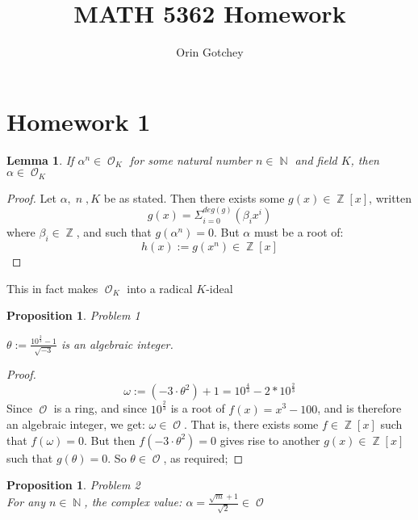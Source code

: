 \documentclass{article}
\newtheorem{lemma}[theorem]{Lemma}
\newtheorem{proposition}[theorem]{Proposition}
\DeclareMathOperator{\Z}{\mathbb{Z}}
\DeclareMathOperator{\N}{\mathbb{N}}
\DeclareMathOperator{\scrO}{\mathscr{O}}
\begin{document}
\title{MATH 5362 Homework}
\author{Orin Gotchey}
\maketitle
\section{Homework 1}
\begin{lemma}
If $\alpha^n\in\scrO_{K}$ for some natural number $n\in\N$ and field $K$, then $\alpha\in\scrO_{K}$
\end{lemma}
\begin{proof}
Let $\alpha,\;n\;,K$ be as stated.  Then there exists some $g(x)\in\Z[x]$, written
\begin{equation}
g(x) = \Sigma_{i=0}^{deg(g)}(\beta_ix^i)
\end{equation}
where $\beta_i\in\Z$, and such that $g(\alpha^n)=0$.  But $\alpha$ must be a root of:
\begin{equation}
h(x) := g(x^n) \in\Z[x]
\end{equation}
\end{proof}
This in fact makes $\scrO_K$ into a radical $K$-ideal
\begin{proposition}{Problem 1}

$\theta := \frac{10^{\frac{2}{3}}-1}{\sqrt{-3}}$ is an algebraic integer.
\end{proposition}
\begin{proof}
\begin{equation}
\omega := (-3\cdot\theta^2)+1 = 10^{\frac{4}{3}} - 2*10^{\frac{2}{3}}
\end{equation}
Since $\scrO$ is a ring, and since $10^{\frac{2}{3}}$ is a root of $f(x) = x^3-100$, and is therefore an algebraic integer, we get: $\omega\in\scrO$.  That is, there exists some $f\in\Z[x]$ such that $f(\omega)=0$.  But then $f(-3\cdot\theta^2)=0$ gives rise to another $g(x)\in\Z[x]$ such that $g(\theta)=0$.  So $\theta\in\scrO$, as required;
\end{proof}
\begin{proposition}{Problem 2}\\
For any $n\in\N$, the complex value: $\alpha = \frac{\sqrt{m}+1}{\sqrt{2}}\in\scrO$
\end{proposition}
\end{document}
